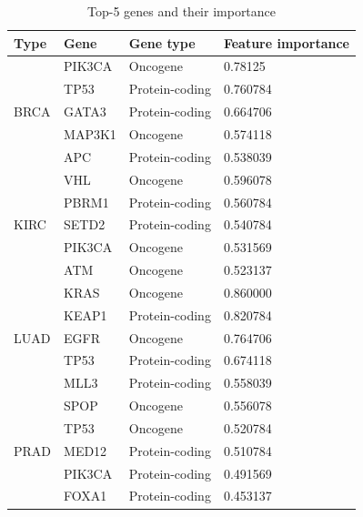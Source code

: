 \begin{table}
    \caption{Top-5 genes and their importance}
    \label{table:proteinimportance} %
    \begin{center}
    \scriptsize
    \vspace{-6mm}
    \begin{tabular}{l|l|l|l}
        \toprule
        \textbf{Type} & \textbf{Gene} & \textbf{Gene type} & \textbf{Feature importance} \\ \midrule
        \multirow{5}{*}{BRCA} & PIK3CA & Oncogene & 0.78125 \\ %
        & TP53 & Protein-coding & 0.760784 \\ %
        & GATA3  & Protein-coding & 0.664706 \\ %
        & MAP3K1  & Oncogene & 0.574118 \\ %
        & APC   & Protein-coding & 0.538039 \\ \midrule
        \multirow{5}{*}{KIRC} & VHL & Oncogene & 0.596078 \\ %
        & PBRM1 & Protein-coding  & 0.560784 \\ %
        & SETD2 & Protein-coding & 0.540784 \\ %
        & PIK3CA & Oncogene & 0.531569 \\ %
        & ATM & Oncogene & 0.523137 \\ %
        \midrule
        \multirow{5}{*}{LUAD}& KRAS & Oncogene & 0.860000 \\ %
        & KEAP1 & Protein-coding & 0.820784 \\ %
        & EGFR & Oncogene & 0.764706 \\ %
        & TP53 & Protein-coding & 0.674118 \\ %
        & MLL3 & Protein-coding & 0.558039 \\ %
        \midrule
        \multirow{5}{*}{PRAD}& SPOP & Oncogene & 0.556078 \\ %
        & TP53 & Oncogene & 0.520784 \\ %
        & MED12 & Protein-coding & 0.510784 \\ %
        & PIK3CA & Protein-coding & 0.491569 \\ %
        & FOXA1 & Protein-coding & 0.453137 \\ %
        \midrule

\end{tabular}
\end{center}
\end{table}
